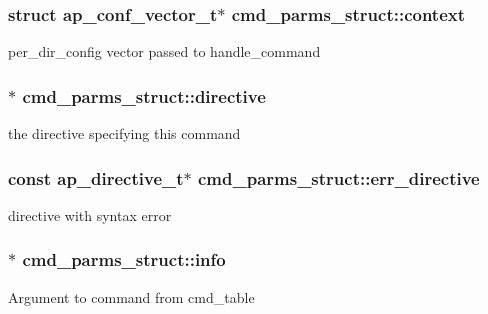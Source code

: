 \subsubsection[{\texorpdfstring{context}{context}}]{\setlength{\rightskip}{0pt plus 5cm}struct {\bf ap\+\_\+conf\+\_\+vector\+\_\+t}$\ast$ cmd\+\_\+parms\+\_\+struct\+::context}\hypertarget{structcmd__parms__struct_afc46a84ba3c87041021ec262910560b9}{}\label{structcmd__parms__struct_afc46a84ba3c87041021ec262910560b9}
per\+\_\+dir\+\_\+config vector passed to handle\+\_\+command 
\subsubsection[{\texorpdfstring{directive}{directive}}]{$\ast$ cmd\+\_\+parms\+\_\+struct\+::directive}\hypertarget{structcmd__parms__struct_a4babc19fc6c90ec1e198838acd39b8dc}{}\label{structcmd__parms__struct_a4babc19fc6c90ec1e198838acd39b8dc}
the directive specifying this command 
\subsubsection[{\texorpdfstring{err\+\_\+directive}{err_directive}}]{\setlength{\rightskip}{0pt plus 5cm}const {\bf ap\+\_\+directive\+\_\+t}$\ast$ cmd\+\_\+parms\+\_\+struct\+::err\+\_\+directive}\hypertarget{structcmd__parms__struct_a9a6a6933d1f49e1ec3761a0caaa96090}{}\label{structcmd__parms__struct_a9a6a6933d1f49e1ec3761a0caaa96090}
directive with syntax error 
\subsubsection[{\texorpdfstring{info}{info}}]{$\ast$ cmd\+\_\+parms\+\_\+struct\+::info}\hypertarget{structcmd__parms__struct_ab152383653530d6d561449de8690bfbb}{}\label{structcmd__parms__struct_ab152383653530d6d561449de8690bfbb}
Argument to command from cmd\+\_\+table 
